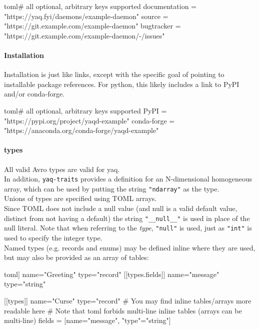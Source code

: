 \begin{codefragment}{toml}\noop
[links]  # all optional, arbitrary keys supported
documentation = "https://yaq.fyi/daemons/example-daemon"
source = "https://git.example.com/example-daemon"
bugtracker = "https://git.example.com/example-daemon/-/issues"
\end{codefragment}

\hypertarget{installation-1}{%
\paragraph{Installation}}

Installation is just like links, except with the specific goal of
pointing to installable package references. For python, this likely
includes a link to PyPI and/or conda-forge.

\begin{codefragment}{toml}\noop
[installation]  # all optional, arbitrary keys supported
PyPI = "https://pypi.org/project/yaqd-example"
conda-forge = "https://anaconda.org/conda-forge/yaqd-example"
\end{codefragment}

\hypertarget{types}{%
\paragraph{types}\label{types}}

All valid
Avro types\cite{avro_shcema} are valid for yaq.\\
In addition, \texttt{yaq-traits} provides a definition for an
N-dimensional homogeneous array, which can be used by putting the string
\texttt{"ndarray"} as the type.\\
Unions of types are specified using TOML arrays.\\
Since TOML does not include a null value (and null is a valid default
value, distinct from not having a default) the string
\texttt{"\_\_null\_\_"} is used in place of the null literal. Note that
when referring to the \emph{type}, \texttt{"null"} is used, just as
\texttt{"int"} is used to specify the integer type.\\
Named types (e.g. records and enums) may be defined inline where they
are used, but may also be provided as an array of tables:

\begin{codefragment}{toml}\noop
[[types]]
name="Greeting"
type="record"
[[types.fields]]
name="message"
type="string"

[[types]]
name="Curse"
type="record"
# You may find inline tables/arrays more readable here
# Note that toml forbids multi-line inline tables (arrays can be multi-line)
fields = [{name="message", "type"="string"}]
\end{codefragment}

